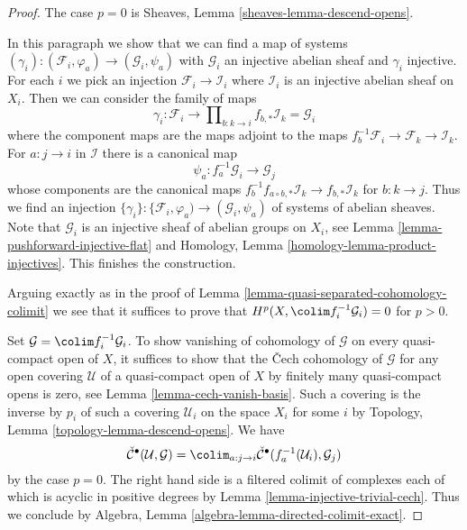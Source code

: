 \begin{proof}
The case $p = 0$ is Sheaves, Lemma \ref{sheaves-lemma-descend-opens}.

\medskip\noindent
In this paragraph we show that we can find a map of systems
$(\gamma_i) : (\mathcal{F}_i, \varphi_a) \to (\mathcal{G}_i, \psi_a)$
with $\mathcal{G}_i$ an injective abelian sheaf and $\gamma_i$ injective.
For each $i$ we pick an injection $\mathcal{F}_i \to \mathcal{I}_i$
where $\mathcal{I}_i$ is an injective abelian sheaf on $X_i$.
Then we can consider the family of maps
$$
\gamma_i :
\mathcal{F}_i
\longrightarrow
\prod\nolimits_{b : k \to i} f_{b, *}\mathcal{I}_k = \mathcal{G}_i
$$
where the component maps are the maps adjoint to the maps
$f_b^{-1}\mathcal{F}_i \to \mathcal{F}_k \to \mathcal{I}_k$.
For $a : j \to i$ in $\mathcal{I}$ there is a canonical map
$$
\psi_a : f_a^{-1}\mathcal{G}_i \to \mathcal{G}_j
$$
whose components are the canonical maps
$f_b^{-1}f_{a \circ b, *}\mathcal{I}_k \to f_{b, *}\mathcal{I}_k$
for $b : k \to j$. Thus we find an injection
$\{\gamma_i\} : \{\mathcal{F}_i, \varphi_a) \to (\mathcal{G}_i, \psi_a)$
of systems of abelian sheaves. Note that $\mathcal{G}_i$ is an injective
sheaf of abelian groups on $X_i$, see
Lemma \ref{lemma-pushforward-injective-flat} and
Homology, Lemma \ref{homology-lemma-product-injectives}.
This finishes the construction.

\medskip\noindent
Arguing exactly as in the proof of
Lemma \ref{lemma-quasi-separated-cohomology-colimit}
we see that it suffices to prove that
$H^p(X, \colim f_i^{-1}\mathcal{G}_i) = 0$ for $p > 0$.

\medskip\noindent
Set $\mathcal{G} = \colim f_i^{-1}\mathcal{G}_i$.
To show vanishing of cohomology of $\mathcal{G}$ on every quasi-compact
open of $X$, it suffices to show that the {\v C}ech cohomology of
$\mathcal{G}$ for any open covering $\mathcal{U}$ of a quasi-compact open of
$X$ by finitely many quasi-compact opens is zero, see
Lemma \ref{lemma-cech-vanish-basis}.
Such a covering is the inverse by $p_i$ of such a covering $\mathcal{U}_i$
on the space $X_i$ for some $i$ by
Topology, Lemma \ref{topology-lemma-descend-opens}. We have
$$
\check{\mathcal{C}}^\bullet(\mathcal{U}, \mathcal{G}) =
\colim_{a : j \to i}
\check{\mathcal{C}}^\bullet(f_a^{-1}(\mathcal{U}_i), \mathcal{G}_j)
$$
by the case $p = 0$. The right hand side is a filtered colimit of
complexes each of which is acyclic in positive degrees by
Lemma \ref{lemma-injective-trivial-cech}. Thus we conclude by
Algebra, Lemma \ref{algebra-lemma-directed-colimit-exact}.
\end{proof}









